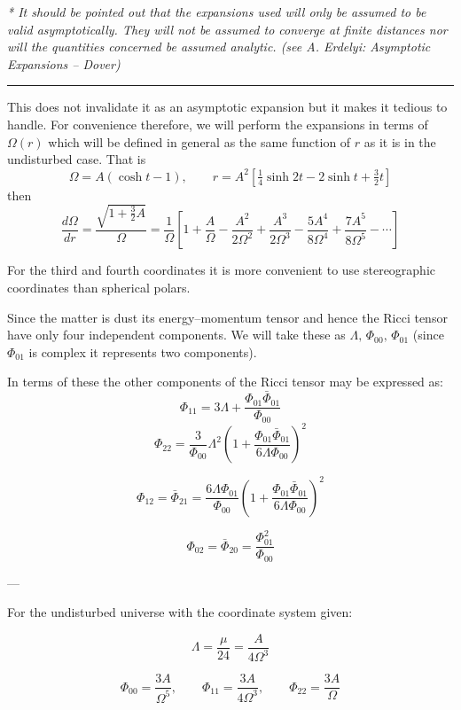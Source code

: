 \textit{* It should be pointed out that the expansions used will only be assumed to be valid asymptotically. They will not be assumed to converge at finite distances nor will the quantities concerned be assumed analytic. (see A. Erdelyi: \textit{Asymptotic Expansions} – Dover)}  \\
\bigskip
\noindent\rule{\linewidth}{0.4pt}  

This does not invalidate it as an asymptotic expansion but it makes it tedious to handle.  
For convenience therefore, we will perform the expansions in terms of $\Omega(r)$ which will be defined in general as the same function of $r$ as it is in the undisturbed case.  
That is
\[
\Omega = A(\cosh t - 1),
\qquad
r = A^{2} \left[ \tfrac{1}{4} \sinh 2t - 2 \sinh t + \tfrac{3}{2} t \right]
\tag{4.8}
\]
then
\[
\frac{d\Omega}{d r} = \frac{\sqrt{1 + \tfrac{3}{2}A}}{\Omega}
= \frac{1}{\Omega} \left[ 1 + \frac{A}{\Omega} - \frac{A^{2}}{2 \Omega^{2}} + \frac{A^{3}}{2 \Omega^{3}} - \frac{5A^{4}}{8 \Omega^{4}} + \frac{7A^{5}}{8 \Omega^{5}} - \cdots \right]
\tag{4.9}
\]

For the third and fourth coordinates it is more convenient to use stereographic coordinates than spherical polars.  

Since the matter is dust its energy–momentum tensor and hence the Ricci tensor have only four independent components.  
We will take these as $\Lambda, \, \Phi_{00}, \, \Phi_{01}$ (since $\Phi_{01}$ is complex it represents two components).  

In terms of these the other components of the Ricci tensor may be expressed as:
\[
\Phi_{11} = 3 \Lambda + \frac{\Phi_{01} \bar{\Phi}_{01}}{\Phi_{00}}
\]
\[
\Phi_{22} = \frac{3}{\Phi_{00}} \Lambda^{2} \left( 1 + \frac{\Phi_{01} \bar{\Phi}_{01}}{6 \Lambda \Phi_{00}} \right)^{2}
\]

\[
\Phi_{12} = \bar{\Phi}_{21} = \frac{6 \Lambda \Phi_{01}}{\Phi_{00}} 
\left( 1 + \frac{\Phi_{01} \bar{\Phi}_{01}}{6 \Lambda \Phi_{00}} \right)^{2}
\]

\[
\Phi_{02} = \bar{\Phi}_{20} = \frac{\Phi_{01}^{2}}{\Phi_{00}}
\tag{4.10}
\]

---

For the undisturbed universe with the coordinate system given:

\[
\Lambda = \frac{\mu}{24} = \frac{A}{4 \Omega^{3}}
\]

\[
\Phi_{00} = \frac{3A}{\Omega^{5}}, 
\qquad 
\Phi_{11} = \frac{3A}{4 \Omega^{3}}, 
\qquad 
\Phi_{22} = \frac{3A}{\Omega}
\]

